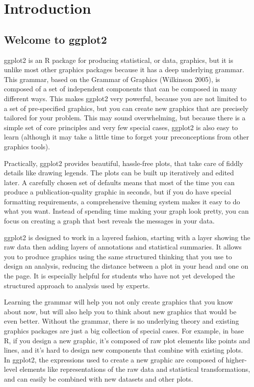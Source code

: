 \chapter{Introduction}\label{cha:introduction}

\section{Welcome to ggplot2}

ggplot2 is an R package for producing statistical, or data, graphics,
but it is unlike most other graphics packages because it has a deep
underlying grammar. This grammar, based on the Grammar of Graphics
(Wilkinson 2005), is composed of a set of independent components that
can be composed in many different ways. This makes ggplot2 very
powerful, because you are not limited to a set of pre-specified
graphics, but you can create new graphics that are precisely tailored
for your problem. This may sound overwhelming, but because there is a
simple set of core principles and very few special cases, ggplot2 is
also easy to learn (although it may take a little time to forget your
preconceptions from other graphics tools).

Practically, ggplot2 provides beautiful, hassle-free plots, that take
care of fiddly details like drawing legends. The plots can be built up
iteratively and edited later. A carefully chosen set of defaults means
that most of the time you can produce a publication-quality graphic in
seconds, but if you do have special formatting requirements, a
comprehensive theming system makes it easy to do what you want. Instead
of spending time making your graph look pretty, you can focus on
creating a graph that best reveals the messages in your data.

ggplot2 is designed to work in a layered fashion, starting with a layer
showing the raw data then adding layers of annotations and statistical
summaries. It allows you to produce graphics using the same structured
thinking that you use to design an analysis, reducing the distance
between a plot in your head and one on the page. It is especially
helpful for students who have not yet developed the structured approach
to analysis used by experts.

Learning the grammar will help you not only create graphics that you
know about now, but will also help you to think about new graphics that
would be even better. Without the grammar, there is no underlying theory
and existing graphics packages are just a big collection of special
cases. For example, in base R, if you design a new graphic, it's
composed of raw plot elements like points and lines, and it's hard to
design new components that combine with existing plots. In ggplot2, the
expressions used to create a new graphic are composed of higher-level
elements like representations of the raw data and statistical
transformations, and can easily be combined with new datasets and other
plots.

